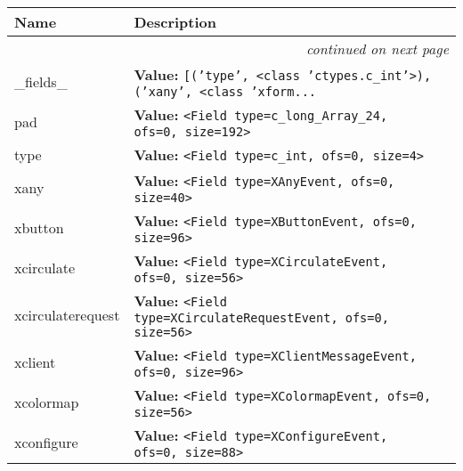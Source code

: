     \vspace{-1cm}
\hspace{\varindent}\begin{longtable}{|p{\varnamewidth}|p{\vardescrwidth}|l}
\cline{1-2}
\cline{1-2} \centering \textbf{Name} & \centering \textbf{Description}& \\
\cline{1-2}
\endhead\cline{1-2}\multicolumn{3}{r}{\small\textit{continued on next page}}\\\endfoot\cline{1-2}
\endlastfoot\raggedright \_\-f\-i\-e\-l\-d\-s\-\_\- & \raggedright \textbf{Value:} 
{\tt \texttt{[}\texttt{(}\texttt{'}\texttt{type}\texttt{'}\texttt{, }{\textless}class 'ctypes.c\_int'{\textgreater}\texttt{)}\texttt{, }\texttt{(}\texttt{'}\texttt{xany}\texttt{'}\texttt{, }{\textless}class 'xform\texttt{...}}&\\
\cline{1-2}
\raggedright p\-a\-d\- & \raggedright \textbf{Value:} 
{\tt {\textless}Field type=c\_long\_Array\_24, ofs=0, size=192{\textgreater}}&\\
\cline{1-2}
\raggedright t\-y\-p\-e\- & \raggedright \textbf{Value:} 
{\tt {\textless}Field type=c\_int, ofs=0, size=4{\textgreater}}&\\
\cline{1-2}
\raggedright x\-a\-n\-y\- & \raggedright \textbf{Value:} 
{\tt {\textless}Field type=XAnyEvent, ofs=0, size=40{\textgreater}}&\\
\cline{1-2}
\raggedright x\-b\-u\-t\-t\-o\-n\- & \raggedright \textbf{Value:} 
{\tt {\textless}Field type=XButtonEvent, ofs=0, size=96{\textgreater}}&\\
\cline{1-2}
\raggedright x\-c\-i\-r\-c\-u\-l\-a\-t\-e\- & \raggedright \textbf{Value:} 
{\tt {\textless}Field type=XCirculateEvent, ofs=0, size=56{\textgreater}}&\\
\cline{1-2}
\raggedright x\-c\-i\-r\-c\-u\-l\-a\-t\-e\-r\-e\-q\-u\-e\-s\-t\- & \raggedright \textbf{Value:} 
{\tt {\textless}Field type=XCirculateRequestEvent, ofs=0, size=56{\textgreater}}&\\
\cline{1-2}
\raggedright x\-c\-l\-i\-e\-n\-t\- & \raggedright \textbf{Value:} 
{\tt {\textless}Field type=XClientMessageEvent, ofs=0, size=96{\textgreater}}&\\
\cline{1-2}
\raggedright x\-c\-o\-l\-o\-r\-m\-a\-p\- & \raggedright \textbf{Value:} 
{\tt {\textless}Field type=XColormapEvent, ofs=0, size=56{\textgreater}}&\\
\cline{1-2}
\raggedright x\-c\-o\-n\-f\-i\-g\-u\-r\-e\- & \raggedright \textbf{Value:} 
{\tt {\textless}Field type=XConfigureEvent, ofs=0, size=88{\textgreater}}&\\

\end{longtable}
